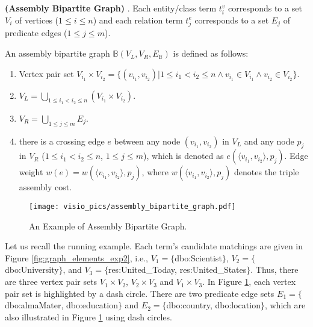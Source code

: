 \begin{definition}\textbf{ (Assembly Bipartite Graph) }. \label{def:assemblygraph}
	Each entity/class term $t_i^{v}$ corresponds to a set $V_i$ of vertices ($1\leq i \leq n$) and each relation term $t_j^{e}$ corresponds to a set $E_j$ of predicate edges ($1\leq j \leq m$).  
	
	An assembly bipartite graph $\mathbb{B}(V_{L},V_{R},E_{\mathbb{B}})$ is defined as follows:
	
	\begin{enumerate}
		\item Vertex pair set $V_{i_1} \times V_{i_2}=\{(v_{i_1},v_{i_2}) | 1\leq i_1 < i_2 \leq n \wedge v_{i_1} \in V_{i_1}  \wedge v_{i_2} \in V_{i_2}\}$.
		\item $V_{L}=\bigcup\nolimits_{1 \le i_1  < i_2  \le n } {(V_{i_1} \times V_{i_2})} $.
		\item  $V_{R}=\bigcup\nolimits_{1 \le j \le m} {E_j }  $.
		\item there is a crossing edge $e$ between any node $(v_{i_1}, v_{i_2})$ in $V_{L}$ and any node $p_j$ in $V_{R}$ ($1 \le i_1  < i_2  \le n$, $1 \le j \le m$), which is denoted as $e(\langle v_{i_1},v_{i_2}\rangle, p_j)$. Edge weight $w(e)=w(\langle v_{i_1},v_{i_2}\rangle, p_j)$, where $w(\langle v_{i_1},v_{i_2}\rangle, p_j)$ denotes the triple assembly cost.  
	\end{enumerate} 
\end{definition}


\begin{figure} [t]
	\begin{center}
		\vspace{-0.15in}
		\texttt{[image: visio\_pics/assembly\_bipartite\_graph.pdf]}
		\caption{An Example of Assembly Bipartite Graph.}
		
		\label{fig:asm_bigraph}
		\vspace{-0.15in}
	\end{center}
\end{figure}

\begin{example} 
Let us recall the running example. Each term's candidate matchings are given in Figure \ref{fig:graph_elements_exp2}, i.e., $V_1=\{$dbo:Scientist$\}$, $V_2=\{$dbo:University$\}$, and $V_3=\{$res:United\_Today, res:United\_States$\}$. Thus, there are three vertex pair sets $V_1 \times V_2$, $V_2 \times V_3$ and $V_1 \times V_3$. In Figure \ref{fig:asm_bigraph}, each vertex pair set is highlighted by a dash circle. There are two predicate edge sets $E_1=\{$dbo:almaMater, dbo:education$\}$ and $E_2=\{$dbo:country, dbo:location$\}$, which are also illustrated in Figure \ref{fig:asm_bigraph} using dash circles. 
\end{example}

